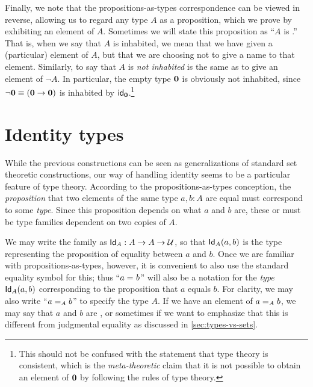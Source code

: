 Finally, we note that the propositions-as-types correspondence can be viewed in reverse, allowing us to regard any type $A$ as a proposition, which we prove by exhibiting an element of $A$.
Sometimes we will state this proposition as ``$A$ is .''
%
%
That is, when we say that $A$ is inhabited, we mean that we have given a (particular) element of $A$, but that we are choosing not to give a name to that element.
Similarly, to say that $A$ is \emph{not inhabited} is the same as to give an element of $\neg A$.
In particular, the empty type $\emptyt$ is obviously not inhabited, since $\neg \emptyt \jdeq (\emptyt \to \emptyt)$ is inhabited by $\idfunc[\emptyt]$.\footnote{This should not be confused with the statement that type theory is consistent, which is the \emph{meta-theoretic} claim that it is not possible to obtain an element of $\emptyt$ by following the rules of type theory.}

%
%
%

\section{Identity types}
\label{sec:identity-types}

%
%
%
%
While the previous constructions can be seen as generalizations of
standard set theoretic constructions, our way of handling identity  seems to be
a particular feature of type theory.
According to the propositions-as-types conception, the \emph{proposition} that two elements of the same type $a,b:A$ are equal must correspond to some \emph{type}.
Since this proposition depends on what $a$ and $b$ are, these  or  must be type families dependent on two copies of $A$.

We may write the family as $\idtypevar{A}:A\to A\to\type$, so that $\idtype[A]ab$ is the type representing the proposition of equality between $a$ and $b$.
Once we are familiar with propositions-as-types, however, it is convenient to also use the standard equality symbol for this; thus ``$\id{a}{b}$'' will also be a notation for the \emph{type} $\idtype[A]ab$ corresponding to the proposition that $a$ equals $b$.
For clarity, we may also write ``$\id[A]{a}{b}$'' to specify the type $A$.
If we have an element of $\id[A]{a}{b}$, we may say that $a$ and $b$ are , or sometimes  if we want to emphasize that this is different from judgmental equality as discussed in \autoref{sec:types-vs-sets}.
%
%

